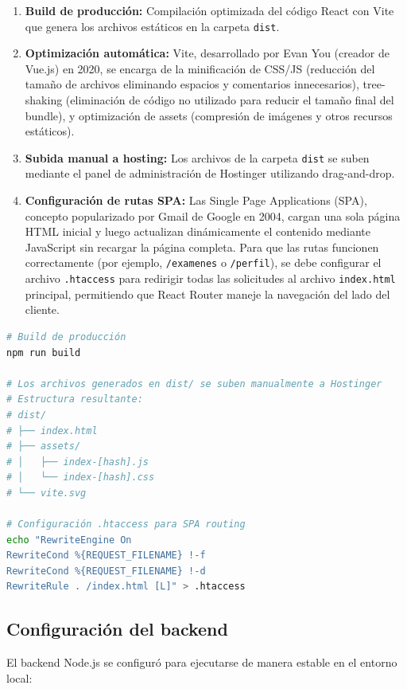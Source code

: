 \documentclass[12pt,a4paper]{report}
\begin{document}
\begin{enumerate}
\item \textbf{Build de producción:} Compilación optimizada del código React con Vite que genera los archivos estáticos en la carpeta \texttt{dist}.
\item \textbf{Optimización automática:} Vite, desarrollado por Evan You (creador de Vue.js) en 2020, se encarga de la minificación de CSS/JS (reducción del tamaño de archivos eliminando espacios y comentarios innecesarios), tree-shaking (eliminación de código no utilizado para reducir el tamaño final del bundle), y optimización de assets (compresión de imágenes y otros recursos estáticos).
\item \textbf{Subida manual a hosting:} Los archivos de la carpeta \texttt{dist} se suben mediante el panel de administración de Hostinger utilizando drag-and-drop.
\item \textbf{Configuración de rutas SPA:} Las Single Page Applications (SPA), concepto popularizado por Gmail de Google en 2004, cargan una sola página HTML inicial y luego actualizan dinámicamente el contenido mediante JavaScript sin recargar la página completa. Para que las rutas funcionen correctamente (por ejemplo, \texttt{/examenes} o \texttt{/perfil}), se debe configurar el archivo \texttt{.htaccess} para redirigir todas las solicitudes al archivo \texttt{index.html} principal, permitiendo que React Router maneje la navegación del lado del cliente.
\end{enumerate}

\begin{lstlisting}[language=bash, caption=Proceso de build y despliegue del frontend]
# Build de producción
npm run build

# Los archivos generados en dist/ se suben manualmente a Hostinger
# Estructura resultante:
# dist/
# ├── index.html
# ├── assets/
# │   ├── index-[hash].js
# │   └── index-[hash].css
# └── vite.svg

# Configuración .htaccess para SPA routing
echo "RewriteEngine On
RewriteCond %{REQUEST_FILENAME} !-f
RewriteCond %{REQUEST_FILENAME} !-d
RewriteRule . /index.html [L]" > .htaccess
\end{lstlisting}

\subsection{Configuración del backend}

El backend Node.js se configuró para ejecutarse de manera estable en el entorno local:
\end{document}
